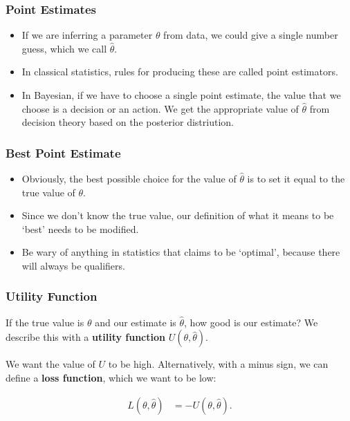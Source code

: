 \documentclass{beamer}
\begin{document}
\begin{frame}
\frametitle{Point Estimates}

\begin{itemize}
\item If we are inferring a parameter $\theta$ from data, we could
give a single number guess, which we call $\hat{\theta}$. \pause
\item In classical statistics, rules for producing these are called point
estimators. \pause
\item  In Bayesian, if we have to choose a single point estimate,
the value that we choose is a decision or an action. We
get the appropriate value of $\hat{\theta}$
from decision theory based on the posterior
distriution.
\end{itemize}

\end{frame}

\begin{frame}
\frametitle{Best Point Estimate}
\begin{itemize}
\item Obviously, the best possible choice for the value of $\hat{\theta}$ is to
set it equal to the true value of $\theta$.\pause
\item Since we don't know the true value, our definition of what it means to
be `best' needs to be modified.\pause
\item Be wary of anything in statistics that claims to be `optimal', because
there will always be qualifiers.
\end{itemize}
\end{frame}


\begin{frame}
\frametitle{Utility Function}
If the true value is $\theta$ and our estimate is $\hat{\theta}$, how good is
our estimate? We describe this with a {\bf utility function} $U(\theta, \hat{\theta})$.
\pause

We want the value of $U$ to be high. Alternatively, with a minus sign, we can
define a {\bf loss function}, which we want to be low:

\begin{align}
L(\theta, \hat{\theta}) &= -U(\theta, \hat{\theta}).
\end{align}

\end{frame}
\end{document}
